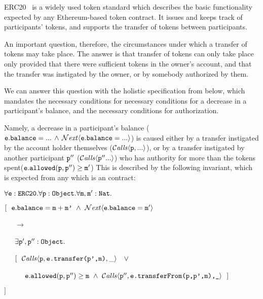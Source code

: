  
 ERC20~\cite{ERC20} is a widely used token standard which describes the 
 basic functionality expected by any    Ethereum-based token contract. 
 It issues and keeps track of participants' tokens, and supports the  transfer
 of tokens between participants. 


An important question, therefore, the circumstances under which a transfer of tokens may take place.
The answer is that transfer of tokens 
 can only take place only provided that  there were sufficient tokens in the
 owner's account, and that
 the transfer was instigated by the owner, or by somebody authorized by them.
 
We can answer this question with the holistic specification from below, which mandates 
the necessary conditions for necessary conditions for a 
 decrease in  a participant's balance, and the necessary conditions for authorization.

Namely, a decrease in  a participant's balance 
(\ie  ${\mbox{\tt{e}}}.{\mbox{\tt{balance}}}=...\, \wedge\, {\mathcal{N}}\textrm{\textit{ext}}\langle {\mbox{\tt{e}}}.{\mbox{\tt{balance}}}=...\rangle$)
is caused either by a transfer instigated by the 
account holder themselves (\ie ${\mathcal{C}}\textrm{\textit{alls}}\langle {\mbox{\tt{p}}}, ...\rangle$), or by
a transfer instigated by another participant ${\mbox{\tt{p}}}''$  (\ie ${\mathcal{C}}\textrm{\textit{alls}}\langle {\mbox{\tt{p}}}''...\rangle$) who 
has authority for more than the tokens spent(\ie  ${\mbox{\tt{e}}}.{\mbox{\tt{allowed}}}({\mbox{\tt{p}}},{\mbox{\tt{p}}}'')\geq {\mbox{\tt{m}}}'$)
This is described by the following invariant, which
is expected from any  which is an   contract:

\vspace{.15cm}
\noindent
$\forall {\mbox{\tt{e}}}:{\mbox{\tt{ERC20}}}.\forall {\mbox{\tt{p}}}:{\mbox{\tt{Object}}}.\forall {\mbox{\tt{m}}},{\mbox{\tt{m}}}':{\mbox{\tt{Nat}}}.$\\
\strut \hspace{0.3cm} $[\ \ \prg{e}.\prg{balance}=\prg{m}+\prg{m'}\ \wedge \ \Next{\prg{e}.\prg{balance}=\prg{m}'}$ \\ %
\strut \hspace{0.4cm} \ \ \ $\longrightarrow$\\
\strut \hspace{0.4cm} \ \ \ $\exists {\mbox{\tt{p}}}',{\mbox{\tt{p}}}'':{\mbox{\tt{Object}}}.$ \\
\strut \hspace{0.4cm} \ \ \  $[\ \  \Calls{\prg{p},\prg{e.transfer(p',m)},\_} \  \  \ \vee\, $\\
\strut \hspace{0.4cm} \ \ \   $\ \ \ \ \prg{e}.\prg{allowed}(\prg{p},\prg{p}'')\geq \prg{m} \ \wedge \ \Calls{\prg{p}'',\prg{e.transferFrom(p,p',m),\_}}\       \  ]$\\
\strut \hspace{0.3cm} $] $
\vspace{.15cm}

